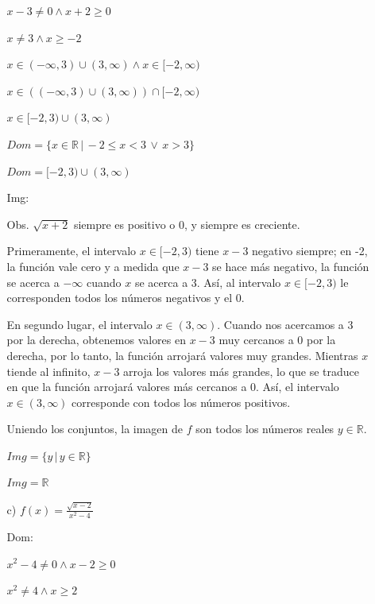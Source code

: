 \documentclass{article}
\begin{document}
\begin{enumerate}
\begin{enumerate}
        $x - 3 \neq 0 \land x + 2 \geq 0$

        $x \neq 3 \land x \geq -2$

        $x \in (-\infty, 3) \cup (3, \infty) \land x \in [-2, \infty)$

        $x \in \left( (-\infty, 3) \cup (3, \infty) \right) \cap [-2, \infty)$

        $x \in [-2, 3) \cup (3, \infty)$
        \vspace{\baselineskip}

        $Dom = \{x \in \mathbb{R} \, | \, -2 \leq x < 3 \, \lor \, x > 3\}$

        $Dom = [-2, 3) \cup (3, \infty)$
        \vspace{\baselineskip}
        
        Img:

        Obs. $\sqrt{x+2}$ siempre es positivo o 0, y siempre es creciente.
        \vspace{\baselineskip}

Primeramente, el intervalo $x \in [-2,3)$ tiene $x-3$ negativo siempre; en -2, la función vale cero y a medida que $x-3$ se hace más negativo, la función se acerca a $-\infty$ cuando $x$ se acerca a 3. Así, al intervalo $x \in [-2,3)$ le corresponden todos los números negativos y el 0.
\vspace{\baselineskip}

En segundo lugar, el intervalo $x \in (3,\infty)$. Cuando nos acercamos a 3 por la derecha, obtenemos valores en $x-3$ muy cercanos a 0 por la derecha, por lo tanto, la función arrojará valores muy grandes. Mientras $x$ tiende al infinito, $x-3$ arroja los valores más grandes, lo que se traduce en que la función arrojará valores más cercanos a 0. Así, el intervalo $x \in (3,\infty)$ corresponde con todos los números positivos.
\vspace{\baselineskip}

Uniendo los conjuntos, la imagen de $f$ son todos los números reales $y \in \mathbb{R}$.

$Img = \{y \, | \, y \in \mathbb{R}\}$

$Img = \mathbb{R}$
        \vspace{\baselineskip}
        \item[c)]\(f(x) = \frac{\sqrt{x-2}}{x^2-4}\)

        Dom:

        $x^2 - 4\neq 0 \land x - 2\geq 0$
        
        $x^2 \neq 4 \land x \geq 2$
        

\end{enumerate}
\end{enumerate}
\end{document}
